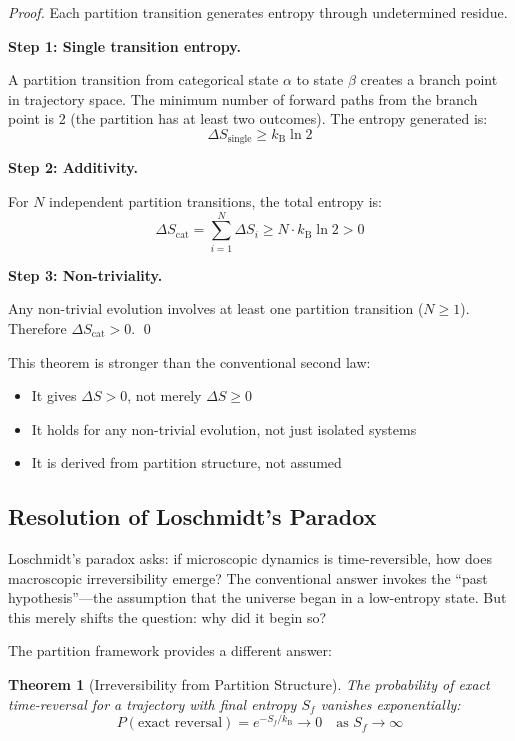 \documentclass[twocolumn,10pt,aps,prd,superscriptaddress,nofootinbib]{revtex4-2}
\newtheorem{theorem}{Theorem}[section]
\theoremstyle{remark}
\newcommand{\kB}{k_{\mathrm{B}}}
\newcommand{\Scat}{S_{\mathrm{cat}}}
\begin{document}
\begin{proof}
Each partition transition generates entropy through undetermined residue.

\textbf{Step 1: Single transition entropy.}

A partition transition from categorical state $\alpha$ to state $\beta$ creates a branch point in trajectory space. The minimum number of forward paths from the branch point is 2 (the partition has at least two outcomes). The entropy generated is:
\begin{equation}
\Delta S_{\text{single}} \geq \kB \ln 2
\label{eq:single_transition_entropy}
\end{equation}

\textbf{Step 2: Additivity.}

For $N$ independent partition transitions, the total entropy is:
\begin{equation}
\Delta \Scat = \sum_{i=1}^N \Delta S_i \geq N \cdot \kB \ln 2 > 0
\label{eq:total_entropy}
\end{equation}

\textbf{Step 3: Non-triviality.}

Any non-trivial evolution involves at least one partition transition ($N \geq 1$). Therefore $\Delta \Scat > 0$. \qed
\end{proof}

This theorem is stronger than the conventional second law:
\begin{itemize}
\item It gives $\Delta S > 0$, not merely $\Delta S \geq 0$
\item It holds for any non-trivial evolution, not just isolated systems
\item It is derived from partition structure, not assumed
\end{itemize}

\subsection{Resolution of Loschmidt's Paradox}

Loschmidt's paradox asks: if microscopic dynamics is time-reversible, how does macroscopic irreversibility emerge? The conventional answer invokes the ``past hypothesis''---the assumption that the universe began in a low-entropy state. But this merely shifts the question: why did it begin so?

The partition framework provides a different answer:

\begin{theorem}[Irreversibility from Partition Structure]
\label{thm:irreversibility}
The probability of exact time-reversal for a trajectory with final entropy $S_f$ vanishes exponentially:
\begin{equation}
P(\text{exact reversal}) = e^{-S_f/\kB} \to 0 \quad \text{as } S_f \to \infty
\label{eq:irreversibility}
\end{equation}
\end{theorem}
\end{document}
